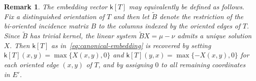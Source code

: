 \documentclass[11pt,a4paper]{article}
\newcommand{\prob}{{\mathscr{P}}}
\newcommand{\setoftrees}{{\mathcal{T}}}
\newcommand{\embedding}{{\mathsf{k}}}
\newtheorem{remark}[theorem]{Remark}
\newtheorem{definition}[theorem]{Definition}
\begin{document}
    \begin{remark}\label{rmk:canonical-embedding}
        The embedding vector $\embedding[T]$ may equivalently be defined as follows. Fix a distinguished orientation of $T$ and then let $\widetilde{B}$ denote the restriction of the bi-oriented incidence matrix $B$ to the columns indexed by the oriented edges of $T$. Since $\widetilde{B}$ has trivial kernel, the linear system $\widetilde{B} X = \mu-\nu$ admits a unique solution $X$. 
        Then $\embedding[T]$ as in~\cref{eq:canonical-embedding} is recovered by setting $\embedding[T](x,y)=\max\{X(x,y),0\}$ and $\embedding[T](y,x)=\max\{-X(x,y),0\}$ for each oriented edge $(x,y)$ of $T$, and by assigning $0$ to all remaining coordinates in $E'$. 
    \end{remark}
    
\end{document}
